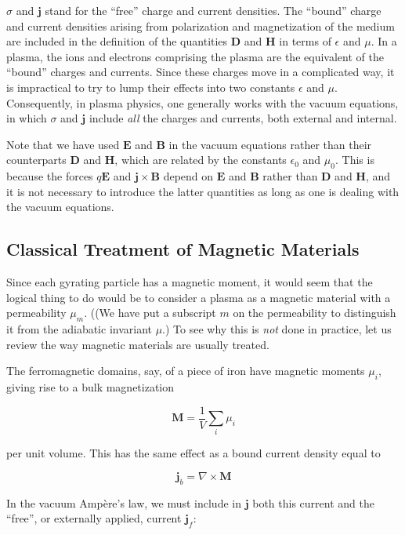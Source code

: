 \documentclass[
  notoc %
]{tufte-book}
\begin{document}
\(\sigma\) and \(\mathbf{j}\) stand for the ``free'' charge and current
densities. The ``bound'' charge and current densities arising from
polarization and magnetization of the medium are included in the
definition of the quantities \(\mathbf{D}\) and \(\mathbf{H}\) in terms
of \(\epsilon\) and \(\mu\). In a plasma, the ions and electrons
comprising the plasma are the equivalent of the ``bound'' charges and
currents. Since these charges move in a complicated way, it is
impractical to try to lump their effects into two constants \(\epsilon\)
and \(\mu\). Consequently, in plasma physics, one generally works with
the vacuum equations, in which \(\sigma\) and \(\mathbf{j}\) include
\emph{all} the charges and currents, both external and internal.

Note that we have used \(\mathbf{E}\) and \(\mathbf{B}\) in the vacuum
equations rather than their counterparts \(\mathbf{D}\) and
\(\mathbf{H}\), which are related by the constants \(\epsilon_0\) and
\(\mu_0\). This is because the forces \(q\mathbf{E}\) and
\(\mathbf{j}\times\mathbf{B}\) depend on \(\mathbf{E}\) and
\(\mathbf{B}\) rather than \(\mathbf{D}\) and \(\mathbf{H}\), and it is
not necessary to introduce the latter quantities as long as one is
dealing with the vacuum equations.

\hypertarget{classical-treatment-of-magnetic-materials}{%
\subsection{Classical Treatment of Magnetic
Materials}\label{classical-treatment-of-magnetic-materials}}

Since each gyrating particle has a magnetic moment, it would seem that
the logical thing to do would be to consider a plasma as a magnetic
material with a permeability \(\mu_m\). ((We have put a subscript \(m\)
on the permeability to distinguish it from the adiabatic invariant
\(\mu\).) To see why this is \emph{not} done in practice, let us review
the way magnetic materials are usually treated.

The ferromagnetic domains, say, of a piece of iron have magnetic moments
\(\mu_i\), giving rise to a bulk magnetization

\[
\mathbf{M} = \frac{1}{V}\sum_i\mu_i
\]

per unit volume. This has the same effect as a bound current density
equal to

\[
\mathbf{j}_b = \nabla\times\mathbf{M}
\]

In the vacuum Ampère's law, we must include in \(\mathbf{j}\) both this
current and the ``free'', or externally applied, current
\(\mathbf{j}_f\):
\end{document}
